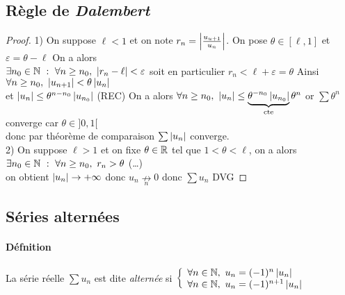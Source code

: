 	\subsection{Règle de \emph{Dalembert}}
	
		\medskip

		\begin{proof}
			{\small 1)} On suppose $\ell<1$ et on note $r_n = \left\vert \frac{u_{u+1}}{u_n} \right\vert$. On pose $\theta \in [\ell,1] $ et $\varepsilon = \theta -\ell$
			On a alors \\ $\exists n_0 \in {\mathbb{N}} ~:~ \forall n\geq n_0 ,~\left\vert r_n -\ell \right\vert <\varepsilon$  soit en particulier $r_n < \ell+\varepsilon 
			=\theta$ Ainsi $\forall n\geq n_0 ,~\left\vert u_{n+1} \right\vert < \theta\left\vert u_n \right\vert$ \\ et $ \left\vert u_n \right\vert \leq \theta^{n-n_0} \left\vert u_{n_0} \right\vert$ {\small (REC) }
			On a alors $\forall n\geq n_0 ,~\left\vert u_n \right\vert \leq \underbrace{\theta^{-n_0} \left\vert u_{n_0} \right\vert}_{\mathrm{cte}} \theta^n$ 
			or $\sum\theta^n$ converge car $\theta \in ]0,1[$ \\donc par théorème de comparaison $\sum \left\vert u_n \right\vert $ converge.
			\vspace*{0.2cm}\\ {\small 2)} On suppose $\ell>1$ et on fixe $\theta \in {\mathbb{R}}$ tel que $ 1<\theta <\ell$, 
			on a alors $\exists n_0 \in {\mathbb{N}} ~:~\forall n\geq n_0 ,~r_n > \theta$ (\dots)\\
			on obtient $\left\vert u_n \right\vert \to +\infty$ donc $u_n \underset{n}{\nrightarrow} 0$ donc $\sum u_n$ DVG
		\end{proof} \medskip 
		

	\subsection{Séries alternées}
		
		\vspace{-15pt}
		\traitd
		\paragraph{Défnition}
			La série réelle $\sum u_n$ est dite \emph{alternée} si $\left\{\begin{array}{l} \forall n\in {\mathbb{N}} ,~u_n = (-1)^n \left\vert u_n \right\vert \\
			\forall n\in{\mathbb{N}},~u_n = (-1)^{n+1} \left\vert u_n \right\vert \end{array}\right.$ 
		\trait
	
